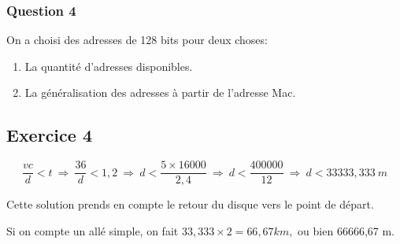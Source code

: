 \subsubsection{Question 4}

On a choisi des adresses de 128 bits pour deux choses:
\begin{enumerate}
  \item La quantité d'adresses disponibles.
  \item La généralisation des adresses à partir de l'adresse Mac.
\end{enumerate}

\subsection{Exercice 4}

$$\frac{vc}{d}<t~\Rightarrow~\frac{36}{d}<1,2~\Rightarrow~d<\frac{5\times16000}{2,4}~\Rightarrow~d<\frac{400000}{12}~\Rightarrow~d<33333,333~m$$

Cette solution prends en compte le retour du disque vers le point de départ.

Si on compte un allé simple, on fait $33,333\times2=66,67km,$ ou bien 66666,67 m.
